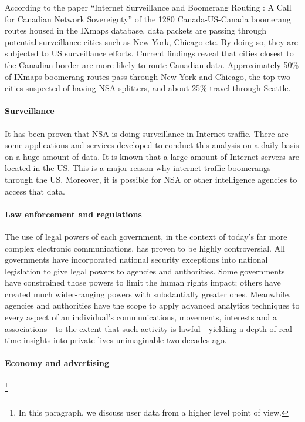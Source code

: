 According to the paper ``Internet Surveillance and Boomerang Routing : A Call 
for Canadian Network Sovereignty'' of the 1280 Canada-US-Canada  boomerang  
routes housed in the IXmaps database, data packets are passing through potential 
surveillance cities such as New York, Chicago etc. By doing so, they are 
subjected  to US surveillance efforts. Current findings reveal that cities 
closest to the Canadian border are more likely to route Canadian data. 
Approximately 50\% of IXmaps boomerang routes pass  through  New  York  and 
Chicago, the top two cities suspected of having NSA splitters, and about 25\% 
travel through Seattle. 

\paragraph{Surveillance\\}

It has been proven that NSA is doing surveillance in Internet traffic. There are 
some applications and services developed to conduct this analysis on a daily 
basis on a huge amount of data. It is known that a large amount of Internet 
servers are located in the US. This is a major reason why internet traffic 
boomerangs through the US. Moreover, it is possible for NSA or other 
intelligence agencies to access that data.

\paragraph{Law enforcement and regulations\\}

The use of legal powers of each government, in the context of today's far more 
complex electronic communications, has proven to be highly controversial. All 
governments have incorporated national security exceptions into national 
legislation to give legal powers to agencies and authorities. Some governments 
have constrained those powers to limit the human rights impact; others have 
created much wider-ranging powers with substantially greater ones. Meanwhile, 
agencies and authorities have the scope to apply advanced analytics techniques 
to every aspect of an individual's communications, movements, interests and a
associations - to the extent that such activity is lawful - yielding a depth of 
real-time insights into private lives unimaginable two decades ago.

\paragraph{Economy and advertising}
\footnote{In this paragraph, we discuss user data from a higher level point of 
view.}


